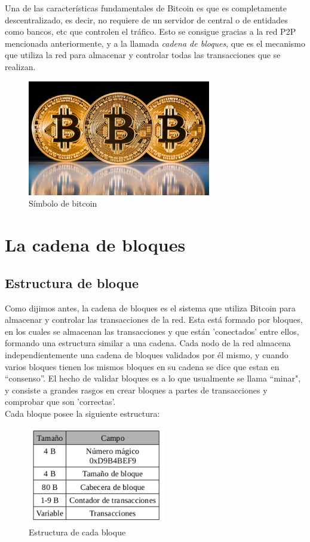 \documentclass[11pt,a4paper]{article}
\begin{document}
Una de las características fundamentales de Bitcoin es que es completamente descentralizado, es decir, no requiere de un servidor de central o de entidades como bancos, etc que controlen el tráfico. Esto se consigue gracias a la red P2P mencionada anteriormente, y a la llamada \emph{cadena de bloques}, que es el mecanismo que utiliza la red para almacenar y controlar todas las transacciones que se realizan.

\begin{figure}[h]
	\includegraphics[width=8cm]{bitcoin.jpg}
	\centering		
	\caption{Símbolo de bitcoin}
	\label{p5}
\end{figure}

\section{La cadena de bloques}
\subsection{Estructura de bloque}
Como dijimos antes, la cadena de bloques es el sistema que utiliza Bitcoin para almacenar y controlar las transacciones de la red. Esta está formado por bloques, en los cuales se almacenan las transacciones y que están 'conectados' entre ellos, formando una estructura similar a una cadena. Cada nodo de la red almacena independientemente una cadena de bloques validados por él mismo, y cuando varios bloques tienen los mismos bloques en su cadena se dice que estan en ``consenso''. El hecho de validar bloques es a lo que usualmente se llama ``minar", y consiste a grandes rasgos en crear bloques a partes de transacciones y comprobar que son 'correctas'.\\

Cada bloque posee la siguiente estructura:

\begin{figure}[h]
	\centering
	\includegraphics[width=6cm]{blockstructure.png}			
	\caption{Estructura de cada bloque}
	\label{p1}
\end{figure}
\end{document}
